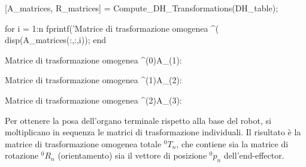 \documentclass[11pt, a4paper]{article}
\begin{document}
\begin{matlabcode}
[A_matrices, R_matrices] = Compute_DH_Transformations(DH_table);

for i = 1:n
    fprintf('Matrice di trasformazione omogenea ^(%
    disp(A_matrices(:,:,i));
end
\end{matlabcode}
\begin{matlaboutput}
Matrice di trasformazione omogenea ^(0)A_(1):
\end{matlaboutput}
\begin{matlaboutput}
Matrice di trasformazione omogenea ^(1)A_(2):
\end{matlaboutput}
\begin{matlaboutput}
Matrice di trasformazione omogenea ^(2)A_(3):
\end{matlaboutput}
\newpage
\begin{par}
\begin{flushleft}
Per ottenere la posa dell'organo terminale rispetto alla base del robot, si moltiplicano in sequenza le matrici di trasformazione individuali. Il risultato è la matrice di trasformazione omogenea totale $^0 T_n$, che contiene sia la matrice di rotazione $^0 R_n$ (orientamento) sia il vettore di posizione $^0 p_n$ dell'end-effector.
\end{flushleft}
\end{par}
\end{document}

